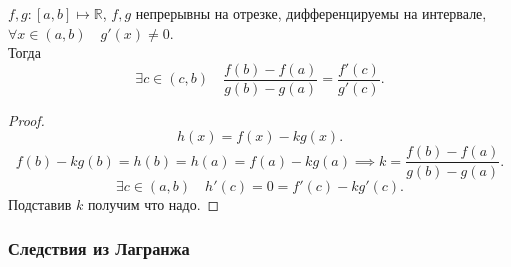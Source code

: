 \documentclass[11pt, oneside]{article}   	%
\begin{document}
        \begin{theorem}
            $f, g: \left[a, b\right] \mapsto \mathbb{R}$, $f,g$ непрерывны на отрезке, дифференцируемы на интервале, $\forall{x\in \left( a, b \right) }\quad g'(x) \neq  0$.\\
            Тогда
            \[ \exists{c\in (c, b)}\quad \frac{f(b) - f(a)}{g(b) - g(a)} = \frac{f'(c)}{g'(c)} .\]
            \begin{proof}
                \[ h(x) = f(x) - kg(x) .\]
                \[ f(b) - kg(b) = h(b) = h(a) = f(a) - kg(a) \implies k = \frac{f(b) - f(a)}{g(b) - g(a)} .\] 
                \[ \exists{c\in \left( a, b \right) }\quad h'(c) = 0 = f'(c) - kg'(c) .\]
                Подставив $k$ получим что надо.
            \end{proof}
        \end{theorem}
        \subsubsection{Следствия из Лагранжа}
            
\end{document}
